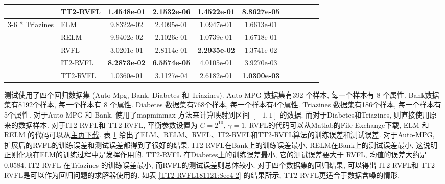 \begin{table} [H]
\begin{center}
\begin{tabular} {llccccccccc}
&TT2-RVFL&\textbf{1.4548e-01}  &  \textbf{2.1532e-06}   & 1.4522e-01  & \textbf{8.8627e-05} \\
\cline{3-6}
\multirow{5} {*} {Triazines} &ELM &9.8322e-02   &2.4095e-01   &1.0947e-01   &1.6613e-01   \\
&RELM    &9.9402e-02   &2.1026e-01   &1.0739e-01   &1.6718e-01\\
&RVFL &3.0201e-01 &  2.8114e-01  & \textbf{2.2935e-02}   & 1.3741e-02\\
&IT2-RVFL&\textbf{8.2873e-02}  &  \textbf{6.5574e-05}  &  4.0105e-01  & 3.9270e-03\\
&TT2-RVFL&1.0360e-01  & 3.1127e-04 &  2.6182e-01 &  \textbf{1.0300e-03} \\
\hline
\end{tabular}
\end{center}
\label{TT2-RVFL181116:Sec4-1}
\end{table}
测试使用了四个回归数据集 (Auto-Mpg, Bank, Diabetes 和  Triazines).
Auto-MPG 数据集有392 个样本, 每一个样本有 8 个属性.   Bank数据集有8192个样本, 每一个样本有 8 个属性.
Diabetes 数据集有768个样本, 每一个样本有4个属性.  Triazines 数据集有186个样本, 每一个样本有5个属性.
对于Auto-MPG 和 Bank, 使用了mapminmax 方法来计算映射到区间 $[-1,1]$ 的数据.
而对于Diabetes和Triazines, 则直接使用原来的数据样本.
对于IT2-RVFL和 TT2-RVFL, 平衡参数设置为 $C=2^{10}$, $\gamma =1$.
RVFL的代码可以从Matlab的File Exchange下载,  ELM 和RELM 的代码可以从\href{https://www.ntu.edu.sg/home/egbhuang/elm_random_hidden_nodes.html}{主页下载}.
表 \ref{TT2-RVFL181116:Sec4-1} 给出了ELM、RELM、RVFL、IT2-RVFL和TT2-RVFL算法的训练误差和测试误差.
对于Auto-MPG, 扩展后的RVFL的训练误差和测试误差都得到了很好的结果.
IT2-RVFL在Bank上的训练误差最小,  RELM在Bank上的测试误差最小, 这说明正则化项在ELM的训练过程中是发挥作用的.
TT2-RVFL 在Diabetes上的训练误差最小, 它的测试误差要大于 RVFL, 均值的误差大约是0.0584.
IT2-RVFL 在Triazines 的训练误差最小, 而RVFL的测试误差则总体较小.
对于四个数据集的回归结果, 可以得出 IT2-RVFL和 TT2-RVFL是可以作为回归问题的求解器使用的.
如表 \ref{TT2-RVFL181121:Sec4-2} 的结果所示, TT2-RVFL更适合于数据含噪的情形.
